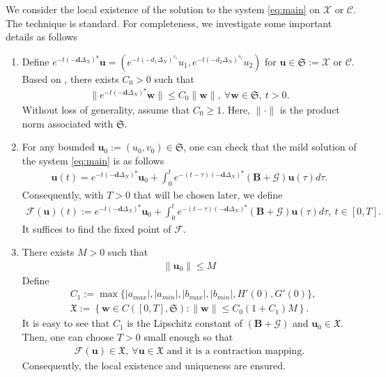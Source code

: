 \documentclass[a4paper,11pt]{amsart}
\theoremstyle{definition}
\numberwithin{equation}{section}
\theoremstyle{definition}
\begin{document}
We consider the local existence of the solution to the system \eqref{eq:main} on $\mathcal{X}$ or $\mathcal{C}$.  The technique is standard. For completeness, we investigate some important details as follows
\begin{enumerate}
\item[•]  Define $e^{-t(-\textbf{d}\Delta_N)^\textbf{s}}\textbf{u}=(e^{-t(-d_1\Delta_N)^{s_1}}u_1,e^{-t(-d_2\Delta_N)^{s_2}}u_2)$ for $\textbf{u}\in \mathfrak{S}:=\mathcal{X} \text{ or }\mathcal{C}$. Based on \cite[Lemma 3.1]{zhao_spatiotemporal_2023}, there exists $C_0>0$ such that
\begin{align*}
\|e^{-t(-\textbf{d}\Delta_N)^\textbf{s}}\textbf{w}\|\leq C_0\|\textbf{w}\|,~\forall\textbf{w}\in \mathfrak{S},~ t>0.
\end{align*}
Without loss of generality, assume that $C_0\geq 1$. Here, $\|\cdot\|$ is the product norm associated with $\mathfrak{S}$.

\item[•] For any bounded $\textbf{u}_0:=(u_0,v_0)\in \mathfrak{S}$, one can check that the mild solution of the system \eqref{eq:main} is as follows
\begin{align*}
\textbf{u}(t)=e^{-t(-\textbf{d}\Delta_N)^\textbf{s}}\textbf{u}_0+\int_0^te^{-(t-\tau)(-\textbf{d}\Delta_N)^\textbf{s}}\left(\mathbf{B}+\mathcal{G}\right)\textbf{u}(\tau)d\tau.
\end{align*}
Consequently, with $T>0$ that will be chosen later, we define
\begin{align*}
\mathcal{F}(\textbf{u})(t):=e^{-t(-\textbf{d}\Delta_N)^\textbf{s}}\textbf{u}_0+\int_0^te^{-(t-\tau)(-\textbf{d}\Delta_N)^\textbf{s}}\left(\mathbf{B}+\mathcal{G}\right)\textbf{u}(\tau)d\tau,~t\in [0,T].
\end{align*}
It suffices to find the fixed point of $\mathcal{F}$.
\item[•] There exists $M>0$ such that
\begin{align*}
\|\textbf{u}_0\|\leq M
\end{align*}
Define
\begin{align*}
&C_1:=\max\{|a_{max}|,|a_{min}|,|b_{max}|,|b_{min}|,H'(0),G'(0)\},\\
& \mathfrak{X}:=\left\{\textbf{w}\in C([0,T],\mathfrak{S}):\|\textbf{w}\|\leq C_0(1+C_1)M\right\}.
\end{align*}
It is easy to see that $C_1$ is the Lipschitz constant of $\left(\mathbf{B}+\mathcal{G}\right)$ and $\textbf{u}_0\in \mathfrak{X}$.
%
Then, one can choose $T>0$ small enough so that 
\begin{align*}
\mathcal{F}(\textbf{u})\in \mathfrak{X},~\forall \textbf{u}\in \mathfrak{X} \text{ and it is a contraction mapping.}
\end{align*}
Consequently, the local existence and uniqueness are ensured.

\end{enumerate}
\end{document}
